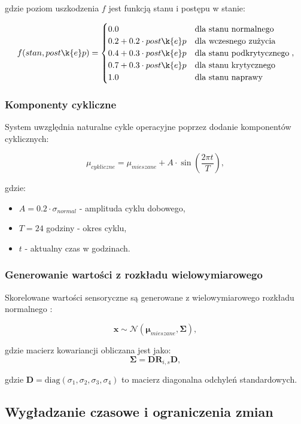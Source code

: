 gdzie poziom uszkodzenia $f$ jest funkcją stanu i postępu w stanie:

$$f(stan, post\k{e}p) = \begin{cases}
0.0 & \text{dla stanu normalnego} \\
0.2 + 0.2 \cdot post\k{e}p & \text{dla wczesnego zu\.{z}ycia} \\
0.4 + 0.3 \cdot post\k{e}p & \text{dla stanu podkrytycznego} \\
0.7 + 0.3 \cdot post\k{e}p & \text{dla stanu krytycznego} \\
1.0 & \text{dla stanu naprawy}
\end{cases},$$

\subsubsection{Komponenty cykliczne}

System uwzględnia naturalne cykle operacyjne poprzez dodanie komponentów cyklicznych:

$$\mu_{cykliczne} = \mu_{mieszane} + A \cdot \sin\left(\frac{2\pi t}{T}\right),$$

gdzie:
\begin{itemize}
    \item $A = 0.2 \cdot \sigma_{normal}$ - amplituda cyklu dobowego,
    \item $T = 24$ godziny - okres cyklu,
    \item $t$ - aktualny czas w godzinach.
\end{itemize}

\subsubsection{Generowanie wartości z rozkładu wielowymiarowego}

Skorelowane wartości sensoryczne są generowane z wielowymiarowego rozkładu normalnego \cite{multivariate_analysis}:

$$\mathbf{x} \sim \mathcal{N}(\boldsymbol{\mu}_{mieszane}, \boldsymbol{\Sigma}),$$

gdzie macierz kowariancji obliczana jest jako:
$$\boldsymbol{\Sigma} = \mathbf{D} \mathbf{R}_{i,s} \mathbf{D},$$

gdzie $\mathbf{D} = \text{diag}(\sigma_1, \sigma_2, \sigma_3, \sigma_4)$ to macierz diagonalna odchyleń standardowych.

\subsection{Wygładzanie czasowe i ograniczenia zmian}
\label{subsec:wygladzanie_czasowe}

